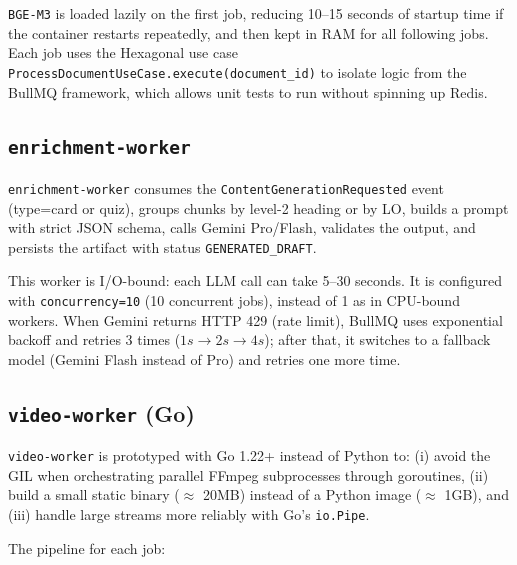 \texttt{BGE-M3} is loaded lazily on the first job, reducing 10--15
seconds of startup time if the container restarts repeatedly, and then
kept in RAM for all following jobs. Each job uses the Hexagonal use case
\texttt{ProcessDocumentUseCase.execute(document\_id)} to isolate logic
from the BullMQ framework, which allows unit tests to run without
spinning up Redis.

\subsection{\texttt{enrichment-worker}}

\texttt{enrichment-worker} consumes the
\texttt{ContentGenerationRequested} event (type=card or quiz), groups
chunks by level-2 heading or by LO, builds a prompt with strict JSON
schema, calls Gemini Pro/Flash, validates the output, and persists the
artifact with status \texttt{GENERATED\_DRAFT}.

This worker is I/O-bound: each LLM call can take 5--30 seconds. It is
configured with \texttt{concurrency=10} (10 concurrent jobs), instead
of 1 as in CPU-bound workers. When Gemini returns HTTP 429 (rate limit),
BullMQ uses exponential backoff and retries 3 times ($1s \to 2s \to
4s$); after that, it switches to a fallback model (Gemini Flash instead
of Pro) and retries one more time.

\subsection{\texttt{video-worker} (Go)}

\texttt{video-worker} is prototyped with Go 1.22+ instead of Python
to: (i) avoid the GIL when orchestrating parallel FFmpeg subprocesses
through goroutines, (ii) build a small static binary ($\approx$ 20MB)
instead of a Python image ($\approx$ 1GB), and (iii) handle large
streams more reliably with Go's \texttt{io.Pipe}.

The pipeline for each job:

